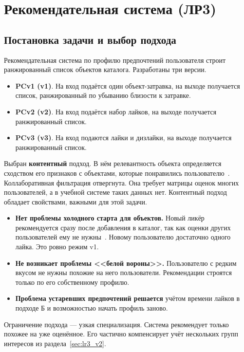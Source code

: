 \chapter{Рекомендательная система (ЛР3)}

\section{Постановка задачи и выбор подхода}

Рекомендательная система по профилю предпочтений пользователя строит ранжированный список объектов каталога. Разработаны три версии.
\begin{itemize}[leftmargin=1.6\parindent, label*=---]
	\item \textbf{PCv1 (v1)}. На вход подаётся один объект-затравка, на выходе получается список, ранжированный по убыванию близости к затравке.
	\item \textbf{PCv2 (v2)}. На вход подаётся набор лайков, на выходе получается ранжированный список.
	\item \textbf{PCv3 (v3)}. На вход подаются лайки и дизлайки, на выходе получается ранжированный список.
\end{itemize}

Выбран \textbf{контентный} подход. В нём релевантность объекта определяется сходством его признаков с объектами, которые понравились пользователю~\cite{lops2011, pazzani2007}. Коллаборативная фильтрация отвергнута. Она требует матрицы оценок многих пользователей, а в учебной системе таких данных нет. Контентный подход обладает свойствами, важными для этой задачи.
\begin{itemize}[leftmargin=1.6\parindent, label*=---]
	\item \textbf{Нет проблемы холодного старта для объектов.} Новый ликёр рекомендуется сразу после добавления в каталог, так как оценки других пользователей ему не нужны~\cite{schein2002}. Новому пользователю достаточно одного лайка. Это ровно режим v1.
	\item \textbf{Не возникает проблемы <<белой вороны>>.} Пользователю с редким вкусом не нужны похожие на него пользователи. Рекомендации строятся только по его собственному профилю.
	\item \textbf{Проблема устаревших предпочтений решается} учётом времени лайков в подходе Б и возможностью начать профиль заново.
\end{itemize}
Ограничение подхода --- узкая специализация. Система рекомендует только похожее на уже оценённое. Его частично компенсирует учёт нескольких групп интересов из раздела~\ref{sec:lr3_v2}.

